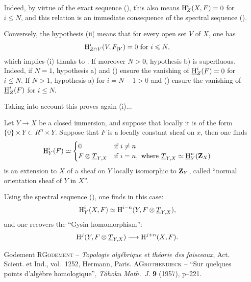 Indeed, by virtue of the exact sequence (), this also means $\operatorname{H}^i_Z(X, F)=0$ for $i\leq N$, and this relation is an immediate consequence of the spectral sequence ().

Conversely, the hypothesis  (ii) means that for every open set $V$ of $X$, one has
$$
\operatorname{H}^i_{Z\cap V}(V, F_{|V}) =0 \text{ for } i\leqslant N,
$$
which implies  (i) thanks to . If moreover $N>0$, hypothesis b) is superfluous. Indeed, if $N=1$, hypothesis a) and () ensure the vanishing of $\operatorname{\underline{H}}^i_Z(F)=0$ for $i\leq N$. If $N>1$, hypothesis a) for $i=N-1>0$ and () ensure the vanishing of $\operatorname{\underline{H}}^i_Z(F)$ for $i\leq N$.

Taking  into account this proves again  (i)...

\begin{remarkstar}
Let $Y \to X$ be a closed immersion, and suppose that locally it is of the form $\{0\}\times Y \subset R^n \times Y$. Suppose that $F$ is a locally constant sheaf on $x$, then one finds
\begin{equation} \label{eq:I.30}
\operatorname{\underline{H}}_Y^i (F)\simeq
\begin{cases}
0 &\text{if } i \neq n\\
F\otimes \underline{T}_{Y, X}& \text{if } i=n, \text{ where } \underline{T}_{Y, X} \simeq \operatorname{\underline{H}}_Y^n(\mathbf{Z}_X)
\end{cases}
\end{equation}
is an extension to $X$ of a sheaf on $Y$ locally isomorphic to $\mathbf{Z}_Y$, called ``normal orientation sheaf of $Y$ in $X$''.
\end{remarkstar}

Using the spectral sequence (), one finds in this case:
\begin{equation} \label{eq:I.31}
\operatorname{H}^i_Y(X, F)\simeq \operatorname{H}^{i-n}(Y, F\otimes \underline{T}_{Y, X}),
\end{equation}
and one recovers the ``Gysin homomorphism\label{hgysin}'':
\begin{equation} \label{eq:I.32} {\H^j(Y, F\otimes \sheaf{T}_{Y, X}) \to \H^{j+n}(X, F)}.
\end{equation}

\begin{thebibliography}{Godement}
\textsc{R\ptbl Godement} -- \emph{Topologie alg\'ebrique et th\'eorie des faisceaux}, Act. Scient. et Ind., vol.~1252, Hermann, Paris.
\textsc{A\ptbl Grothendieck} -- ``Sur quelques points d'alg\`ebre homologique'', \emph{\hbox{T\^{o}hoku} Math.~J.} \textbf{9} (1957), p--221.
\end{thebibliography}
